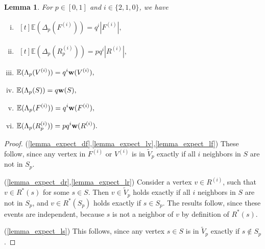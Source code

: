 \documentclass{article}
\theoremstyle{plain}
\theoremstyle{remark}
\theoremstyle{plain}
\newtheorem{lemma}[theorem]{Lemma}
\numberwithin{equation}{section}
\renewcommand{\b}{{\bf{w}}}
\begin{document}
	\begin{lemma}\label{lemma_expect}
		For $p\in[0,1]$ and $i\in\{2,1,0\}$, we have
		\begin{enumerate}[(i)]
			\item\label{lemma_expect_df} $\begin{aligned}[t]
				\mathbb{E}(\Delta_p(F^{(i)}))=q^i|F^{(i)}|,
			\end{aligned}$
			\item\label{lemma_expect_dr} $\begin{aligned}[t]
				\mathbb{E}(\Delta_p(R^{(i)}_p))=pq^i|R^{(i)}|,
			\end{aligned}$
			\item\label{lemma_expect_lv} $\begin{aligned}[t]
				\mathbb{E}(\Lambda_p(V^{(i)}))=q^i\b(V^{(i)}),
			\end{aligned}$
			\item\label{lemma_expect_ls} $\begin{aligned}[t]
				\mathbb{E}(\Lambda_p(S))=q\b(S),
			\end{aligned}$
			\item\label{lemma_expect_lf} $\begin{aligned}[t]
				\mathbb{E}(\Lambda_p(F^{(i)}))=q^i\b(F^{(i)}),
			\end{aligned}$
			\item\label{lemma_expect_lr} $\begin{aligned}[t]
				\mathbb{E}(\Lambda_p(R^{(i)}_p))=pq^i\b(R^{(i)}).
			\end{aligned}$
		\end{enumerate}
	\end{lemma}
	
	\begin{proof}
		(\ref{lemma_expect_df},\ref{lemma_expect_lv},\ref{lemma_expect_lf}) These follow, since any vertex in $F^{(i)}$ or $V^{(i)}$ is in $\widetilde{V}_p$ exactly if all $i$ neighbors in $S$ are not in $S_p$.
		
		(\ref{lemma_expect_dr},\ref{lemma_expect_lr}) Consider a vertex $v\in R^{(i)}$, such that $v\in R^*(s)$ for some $s\in S$. Then $v\in\widetilde{V}_p$ holds exactly if all $i$ neighbors in $S$ are not in $S_p$, and $v\in R^*(S_p)$ holds exactly if $s\in S_p$. The results follow, since these events are independent, because $s$ is not a neighbor of $v$ by definition of $R^*(s)$.
		
		(\ref{lemma_expect_ls}) This follows, since any vertex $s\in S$ is in $\widetilde{V}_p$ exactly if $s\not\in S_p$.
	\end{proof}
	
\end{document}
